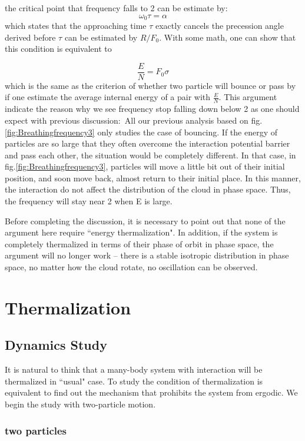 \documentclass[aps,pre,twocolumn
,groupedaddress]{revtex4-1}
\begin{document}
the critical point that frequency falls to 2 can be estimate by:
\begin{equation}
\omega_0 \tau=\alpha
\end{equation}
which states that the approaching time $\tau$ exactly cancels the precession angle derived before
$\tau$ can be estimated by $R/F_0$. With some math, one can show that this condition is equivalent to 

\begin{equation}
\frac{E}{N}=F_0\sigma
\end{equation}
which is the same as the criterion of whether two particle will bounce or pass by if one estimate the average internal energy of a pair with $\frac{E}{N}$. This argument indicate the reason why we see frequency stop falling down below 2 as one should expect with previous discussion:\
All our previous analysis based on fig.\ref{fig:Breathingfrequency3} only studies the case of bouncing. If the energy of particles are so large that they often overcome the interaction potential barrier and pass each other, the situation would be completely different. In that case, in fig.\ref{fig:Breathingfrequency3}, particles will move a little bit out of their initial position, and soon move back, almost return to their initial place. In this manner, the interaction do not affect the distribution of the cloud in phase space. Thus, the frequency will stay near 2 when E is large.

Before completing the discussion, it is necessary to point out that none of the argument here require ``energy thermalization". In addition, if the system is completely thermalized in terms of their phase of orbit in phase space, the argument will no longer work -- there is a stable isotropic distribution in phase space, no matter how the cloud rotate, no oscillation can be observed.


\section{Thermalization}
\subsection{Dynamics Study}
It is natural to think that a many-body system with interaction will be thermalized in ``usual" case. To study the condition of thermalization is equivalent to find out the mechanism that prohibits the system from ergodic. We begin the study with two-particle motion. 
\subsubsection{two particles}
\end{document}
